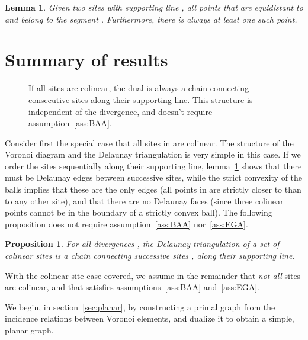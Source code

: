\documentclass[11pt]{article}
\newtheorem{lemma}{Lemma}
\newtheorem{proposition}{Proposition}
\begin{document}
\begin{lemma}\label{lem:midpoint}
Given two sites  with supporting line , 
	all points  that are equidistant to  and  
	belong to the segment . 
Furthermore, there is always at least one such point. \end{lemma}





\section{Summary of results}\label{sec:summary}


\begin{figure}[ht]
\begin{center}
\quad
{}
\caption{If all sites are colinear, the dual is always a chain connecting consecutive sites along their supporting line.
This structure is independent of the divergence, and doesn't require assumption~\ref{ass:BAA}. }
\label{fig:colinear}
\end{center}
\end{figure}

Consider first the special case that all sites in  are colinear. The structure of the Voronoi diagram and the Delaunay triangulation is very simple in this case. 
If we order the sites  sequentially along their supporting line, 
lemma~\ref{lem:midpoint} shows that there must be Delaunay edges between successive sites, 
	while the strict convexity of the balls implies that these are the only edges
	(all points in  are strictly closer to  than to any other site), 
	and that there are no Delaunay faces
	(since three colinear points cannot be in the boundary of a strictly convex ball). 
The following proposition does not require assumption~\ref{ass:BAA} nor~\ref{ass:EGA}. 


\begin{proposition}
{For all divergences} , 
	the Delaunay triangulation of a set of colinear sites is a chain connecting successive sites ,  
	along their supporting line. 
\end{proposition}

With the colinear site case covered, we assume in the remainder 
	that \emph{not all} sites are colinear, 
	and that  satisfies assumptions~\ref{ass:BAA} and~\ref{ass:EGA}. 


We begin, in section~\ref{sec:planar}, by constructing a primal graph from the incidence relations between Voronoi elements, 
	and dualize it to obtain a simple, planar graph. 
\end{document}
